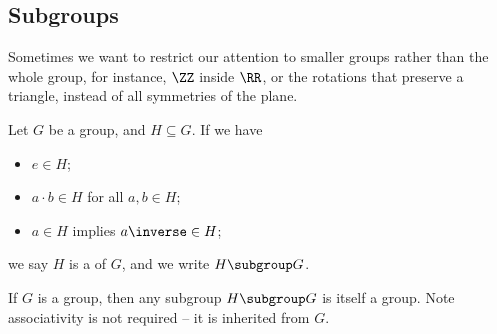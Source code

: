 \subsection{Subgroups}
\label{sec:subgroups}

Sometimes we want to restrict our attention to smaller groups rather than the whole group, for instance, \(\ZZ\) inside \(\RR\), or the rotations that preserve a triangle, instead of all symmetries of the plane.

\begin{definition}[Subgroup]
    \label{def:subgroup}%
    Let \(G\) be a group, and \(H \subseteq G\). If we have
    \begin{itemize}
        \item {} \(e \in H\);
        \item {} \(a \cdot b \in H\) for all \(a, b \in H\);
        \item {} \(a \in H\) implies \(a\inverse \in H\);
    \end{itemize}
    we say \(H\) is a  of \(G\), and we write \(H \subgroup G\).
\end{definition}

\begin{remark}
    If \(G\) is a group, then any subgroup \(H \subgroup G\) is itself a group. Note associativity is not required -- it is inherited from \(G\).
\end{remark}

